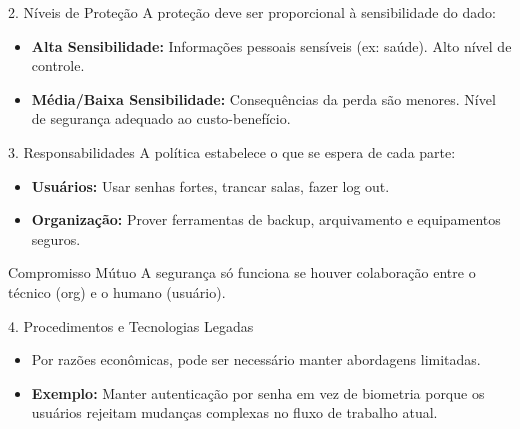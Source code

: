 \documentclass[aspectratio=169]{beamer}
\begin{document}
\begin{frame}{2. Níveis de Proteção}
    A proteção deve ser proporcional à sensibilidade do dado:
    \begin{itemize}
        \item \textbf{Alta Sensibilidade:} Informações pessoais sensíveis (ex: saúde). Alto nível de controle.
        \item \textbf{Média/Baixa Sensibilidade:} Consequências da perda são menores. Nível de segurança adequado ao custo-benefício.
    \end{itemize}
    \centering
\end{frame}

\begin{frame}{3. Responsabilidades}
    A política estabelece o que se espera de cada parte:
    \begin{itemize}
        \item \textbf{Usuários:} Usar senhas fortes, trancar salas, fazer log out.
        \item \textbf{Organização:} Prover ferramentas de backup, arquivamento e equipamentos seguros.
    \end{itemize}
    \begin{exampleblock}{Compromisso Mútuo}
        A segurança só funciona se houver colaboração entre o técnico (org) e o humano (usuário).
    \end{exampleblock}
\end{frame}

\begin{frame}{4. Procedimentos e Tecnologias Legadas}
    \begin{itemize}
        \item Por razões econômicas, pode ser necessário manter abordagens limitadas.
        \item \textbf{Exemplo:} Manter autenticação por senha em vez de biometria porque os usuários rejeitam mudanças complexas no fluxo de trabalho atual.
    \end{itemize}
\end{frame}
\end{document}
